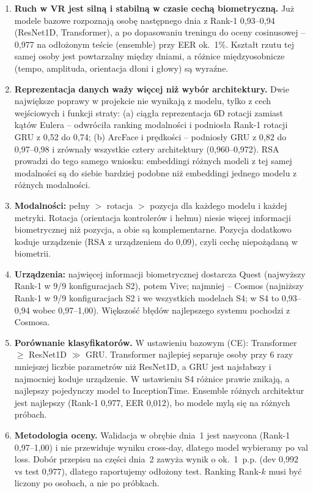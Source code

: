 \begin{enumerate}
  \item \textbf{Ruch w VR jest silną i stabilną w czasie cechą biometryczną.} Już modele bazowe
        rozpoznają osobę następnego dnia z Rank-1 0{,}93--0{,}94 (ResNet1D, Transformer), a po
        dopasowaniu treningu do oceny cosinusowej -- 0{,}977 na odłożonym teście (ensemble) przy EER
        ok.~1\%. Kształt rzutu tej samej osoby jest powtarzalny między dniami, a różnice
        międzyosobnicze (tempo, amplituda, orientacja dłoni i głowy) są wyraźne.
  \item \textbf{Reprezentacja danych waży więcej niż wybór architektury.} Dwie największe poprawy w
        projekcie nie wynikają z modelu, tylko z cech wejściowych i funkcji straty:
        (a) ciągła reprezentacja 6D rotacji zamiast kątów Eulera -- odwróciła ranking modalności i
        podniosła Rank-1 rotacji GRU z 0{,}52 do 0{,}74; (b) ArcFace i prędkości -- podniosły
        GRU z 0{,}82 do 0{,}97--0{,}98 i zrównały wszystkie cztery architektury (0{,}960--0{,}972).
        RSA prowadzi do tego samego wniosku: embeddingi różnych modeli z tej samej modalności są do
        siebie bardziej podobne niż embeddingi jednego modelu z różnych modalności.
  \item \textbf{Modalności:} pełny $>$ rotacja $>$ pozycja dla każdego modelu i każdej metryki.
        Rotacja (orientacja kontrolerów i hełmu) niesie więcej informacji biometrycznej niż pozycja,
        a obie są komplementarne. Pozycja dodatkowo koduje urządzenie (RSA z urządzeniem do 0{,}09),
        czyli cechę niepożądaną w biometrii.
  \item \textbf{Urządzenia:} najwięcej informacji biometrycznej dostarcza Quest (najwyższy Rank-1 w
        9/9 konfiguracjach S2), potem Vive; najmniej -- Cosmos (najniższy Rank-1 w 9/9 konfiguracjach
        S2 i we wszystkich modelach S4; w S4 to 0{,}93--0{,}94 wobec 0{,}97--1{,}00). Większość
        błędów najlepszego systemu pochodzi z Cosmosa.
  \item \textbf{Porównanie klasyfikatorów.} W ustawieniu bazowym (CE): Transformer $\geq$ ResNet1D
        $\gg$ GRU. Transformer najlepiej separuje osoby przy 6 razy mniejszej liczbie parametrów niż
        ResNet1D, a GRU jest najsłabszy i najmocniej koduje urządzenie. W ustawieniu S4 różnice
        prawie znikają, a najlepszy pojedynczy model to InceptionTime. Ensemble różnych architektur
        jest najlepszy (Rank-1 0{,}977, EER 0{,}012), bo modele mylą się na różnych próbach.
  \item \textbf{Metodologia oceny.} Walidacja w obrębie dnia~1 jest nasycona (Rank-1 0{,}97--1{,}00)
        i nie przewiduje wyniku cross-day, dlatego model wybieramy po val loss. Dobór przepisu na
        części dnia~2 zawyża wynik o ok.~1~p.p. (dev 0{,}992 vs test 0{,}977), dlatego raportujemy
        odłożony test. Ranking Rank-$k$ musi być liczony po osobach, a nie po próbkach.
\end{enumerate}

